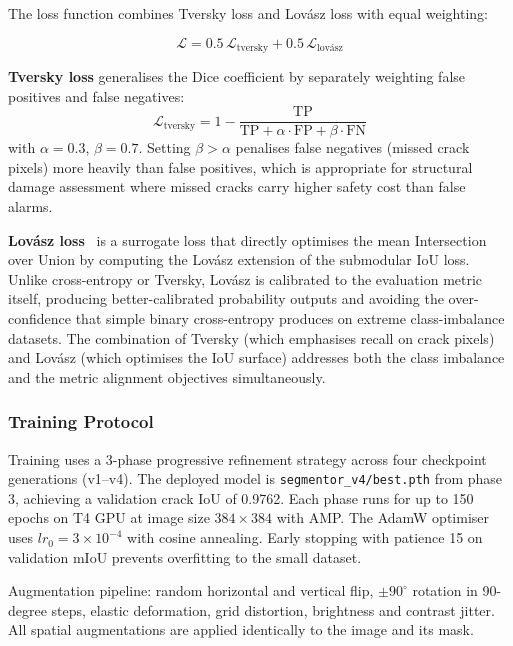 \documentclass[12pt,a4paper]{article}
\begin{document}
The loss function combines Tversky loss and Lov\'{a}sz loss with equal weighting:

\begin{equation}
\mathcal{L} = 0.5\,\mathcal{L}_\text{tversky} + 0.5\,\mathcal{L}_\text{lov\'{a}sz}
\end{equation}

\textbf{Tversky loss} generalises the Dice coefficient by separately weighting false positives and false negatives:
\begin{equation}
\mathcal{L}_\text{tversky} = 1 - \frac{\text{TP}}{\text{TP} + \alpha \cdot \text{FP} + \beta \cdot \text{FN}}
\end{equation}
with $\alpha=0.3$, $\beta=0.7$. Setting $\beta > \alpha$ penalises false negatives (missed crack pixels) more heavily than false positives, which is appropriate for structural damage assessment where missed cracks carry higher safety cost than false alarms.

\textbf{Lov\'{a}sz loss}~\cite{berman2018lovasz} is a surrogate loss that directly optimises the mean Intersection over Union by computing the Lov\'{a}sz extension of the submodular IoU loss. Unlike cross-entropy or Tversky, Lov\'{a}sz is calibrated to the evaluation metric itself, producing better-calibrated probability outputs and avoiding the over-confidence that simple binary cross-entropy produces on extreme class-imbalance datasets. The combination of Tversky (which emphasises recall on crack pixels) and Lov\'{a}sz (which optimises the IoU surface) addresses both the class imbalance and the metric alignment objectives simultaneously.

\subsubsection{Training Protocol}

Training uses a 3-phase progressive refinement strategy across four checkpoint generations (v1--v4). The deployed model is \texttt{segmentor\_v4/best.pth} from phase 3, achieving a validation crack IoU of 0.9762. Each phase runs for up to 150 epochs on T4 GPU at image size $384 \times 384$ with AMP. The AdamW optimiser uses $lr_0 = 3 \times 10^{-4}$ with cosine annealing. Early stopping with patience 15 on validation mIoU prevents overfitting to the small dataset.

Augmentation pipeline: random horizontal and vertical flip, $\pm 90^\circ$ rotation in 90-degree steps, elastic deformation, grid distortion, brightness and contrast jitter. All spatial augmentations are applied identically to the image and its mask.
\end{document}
